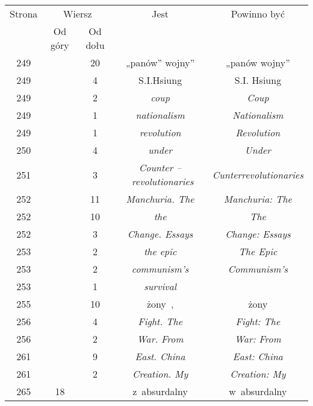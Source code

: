\documentclass[a4paper,11pt]{article}
\numberwithin{equation}{section}
\begin{document}
\begin{center}
  \begin{tabular}{|c|c|c|c|c|}
    \hline
    Strona & \multicolumn{2}{c|}{Wiersz} & Jest
                              & Powinno być \\ \cline{2-3}
    & Od góry & Od dołu & & \\
    \hline
    249 & & 20 & „panów” wojny” & „panów wojny” \\
    249 & &  4 & S.I.Hsiung & S.I. Hsiung \\
    249 & &  2 & \textit{coup} & \textit{Coup} \\
    249 & &  1 & \textit{nationalism} & \textit{Nationalism} \\
    249 & &  1 & \textit{revolution} & \textit{Revolution} \\
    250 & &  4 & \textit{under} & \textit{Under} \\
    251 & &  3 & \textit{Counter --~revolutionaries}
           & \textit{Cunterrevolutionaries} \\
    252 & & 11 & \textit{Manchuria. The} & \textit{Manchuria: The} \\
    252 & & 10 & \textit{the} & \textit{The} \\
    252 & &  3 & \textit{Change. Essays} & \textit{Change: Essays} \\
    253 & &  2 & \textit{the epic} & \textit{The Epic} \\
    253 & &  2 & \textit{communism's} & \textit{Communism's} \\
    253 & &  1 & \textit{survival} & \\
    255 & & 10 & żony~, & żony \\
    256 & &  4 & \textit{Fight. The} & \textit{Fight: The} \\
    256 & &  2 & \textit{War. From} & \textit{War: From} \\
    261 & &  9 & \textit{East. China} & \textit{East: China} \\
    261 & &  2 & \textit{Creation. My} & \textit{Creation: My} \\
    265 & 18 & & z~absurdalny & w~absurdalny \\
    \hline
  \end{tabular}

\end{center}

\VerSpaceTwo


\end{document}
